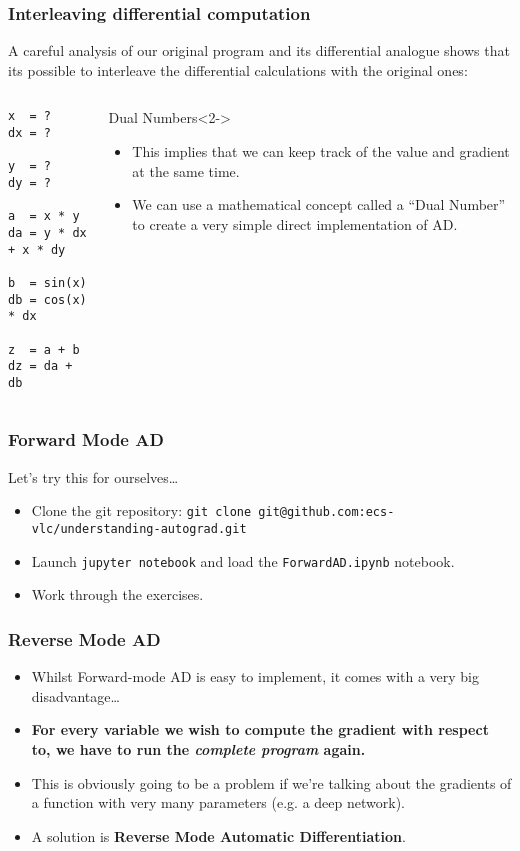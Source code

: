 \documentclass{beamer}
\begin{document}
\begin{frame}[fragile]
\frametitle{Interleaving differential computation}

A careful analysis of our original program and its differential analogue shows that its possible to interleave the differential calculations with the original ones:
\begin{columns}
\begin{lstlisting}
x  = ?
dx = ?

y  = ?
dy = ?

a  = x * y
da = y * dx + x * dy

b  = sin(x)
db = cos(x) * dx

z  = a + b
dz = da + db
\end{lstlisting}

\begin{block}{Dual Numbers}<2->
	\begin{itemize}
		\item<2-> This implies that we can keep track of the value and gradient at the same time.
		\item<3-> We can use a mathematical concept called a ``Dual Number'' to create a very simple direct implementation of AD.
	\end{itemize}
\end{block}

\end{columns}
\end{frame}

\begin{frame}
\frametitle{Forward Mode AD}

\begin{block}{Let's try this for ourselves\ldots}
\begin{itemize}
	\item Clone the git repository: \lstinline!git clone git@github.com:ecs-vlc/understanding-autograd.git!
	\item Launch \lstinline!jupyter notebook! and load the \lstinline!ForwardAD.ipynb! notebook.
	\item Work through the exercises.
\end{itemize}
\end{block}
\end{frame}

\begin{frame}
\frametitle{Reverse Mode AD}
\begin{itemize}
	\item<+-> Whilst Forward-mode AD is easy to implement, it comes with a very big disadvantage\ldots
	\item<+-> \textbf{For every variable we wish to compute the gradient with respect to, we have to run the \emph{complete program} again.}
	\item<+-> This is obviously going to be a problem if we're talking about the gradients of a function with very many parameters (e.g. a deep network).
	\item<+-> A solution is \textbf{Reverse Mode Automatic Differentiation}. 
\end{itemize}
\end{frame}
\end{document}
